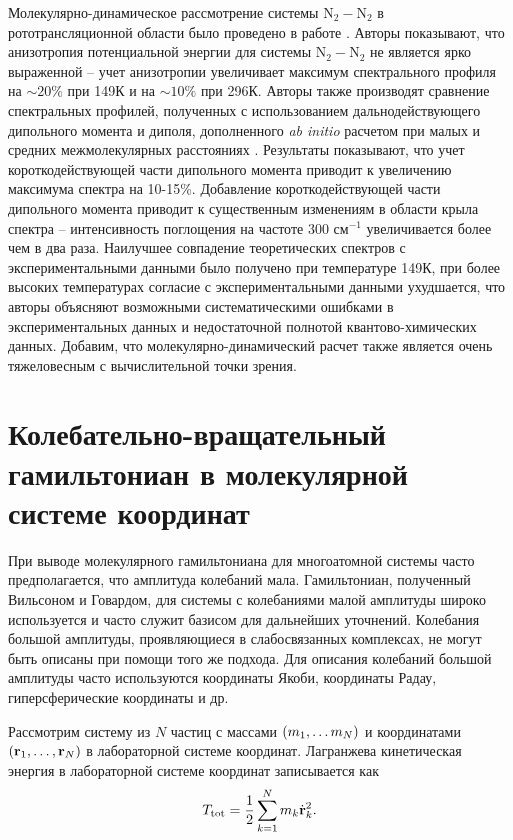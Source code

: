 Молекулярно-динамическое рассмотрение системы N$_2-$N$_2$ в рототрансляционной области было проведено в работе \cite{bussery2014}. Авторы показывают, что анизотропия потенциальной энергии для системы N$_2-$N$_2$ не является ярко выраженной -- учет анизотропии увеличивает максимум спектрального профиля на $\sim 20\%$ при 149К и на $\sim 10\%$ при 296К. Авторы также производят сравнение спектральных профилей, полученных с использованием дальнодействующего дипольного момента и диполя, дополненного \textit{ab initio} расчетом при малых и средних межмолекулярных расстояниях \cite{lokshtanov2008}. Результаты показывают, что учет короткодействующей части дипольного момента приводит к увеличению максимума спектра на 10-15\%. Добавление короткодействующей части дипольного момента приводит к существенным изменениям в области крыла спектра -- интенсивность поглощения на частоте 300 см$^{-1}$ увеличивается более чем в два раза. Наилучшее совпадение теоретических спектров с экспериментальными данными было получено при температуре 149К, при более высоких температурах согласие с экспериментальными данными ухудшается, что авторы объясняют возможными систематическими ошибками в экспериментальных данных и недостаточной полнотой квантово-химических данных. Добавим, что молекулярно-динамический расчет также является очень тяжеловесным с вычислительной точки зрения.

\section{Колебательно-вращательный гамильтониан в молекулярной системе координат}

При выводе молекулярного гамильтониана для многоатомной системы часто предполагается, что амплитуда колебаний мала. Гамильтониан, полученный Вильсоном и Говардом, для системы с колебаниями малой амплитуды широко используется и часто служит базисом для дальнейших уточнений. Колебания большой амплитуды, проявляющиеся в слабосвязанных комплексах, не могут быть описаны при помощи того же подхода. Для описания колебаний большой амплитуды часто используются координаты Якоби, координаты Радау, гиперсферические координаты и др. \par 
Рассмотрим систему из $N$ частиц с массами $\left( m_1, \dots m_N \right)$ и координатами $\left( \mathbf{r}_1, \dots, \mathbf{r}_N \right)$ в лабораторной системе координат. Лагранжева кинетическая энергия в лабораторной системе координат записывается как
\begin{gather}
    T_\text{tot} = \frac{1}{2} \sum_{k = 1}^N m_k \dot{\mathbf{r}}_k^2.
\end{gather}

